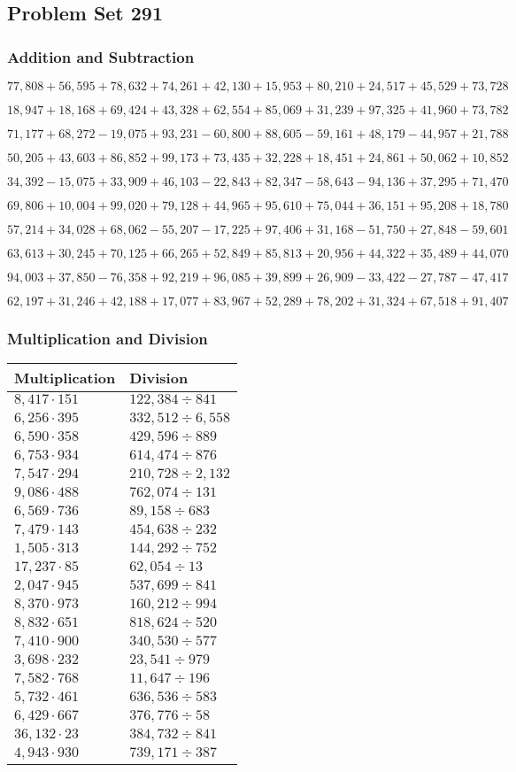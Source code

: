\hypertarget{problem-set-291}{%
\subsection{Problem Set 291}\label{problem-set-291}}

\hypertarget{addition-and-subtraction}{%
\subsubsection{Addition and
Subtraction}\label{addition-and-subtraction}}

\(77,808+56,595+78,632+74,261+42,130+15,953+80,210+24,517+45,529+73,728\)

\(18,947+18,168+69,424+43,328+62,554+85,069+31,239+97,325+41,960+73,782\)

\(71,177+68,272-19,075+93,231-60,800+88,605-59,161+48,179-44,957+21,788\)

\(50,205+43,603+86,852+99,173+73,435+32,228+18,451+24,861+50,062+10,852\)

\(34,392-15,075+33,909+46,103-22,843+82,347-58,643-94,136+37,295+71,470\)

\(69,806+10,004+99,020+79,128+44,965+95,610+75,044+36,151+95,208+18,780\)

\(57,214+34,028+68,062-55,207-17,225+97,406+31,168-51,750+27,848-59,601\)

\(63,613+30,245+70,125+66,265+52,849+85,813+20,956+44,322+35,489+44,070\)

\(94,003+37,850-76,358+92,219+96,085+39,899+26,909-33,422-27,787-47,417\)

\(62,197+31,246+42,188+17,077+83,967+52,289+78,202+31,324+67,518+91,407\)

\hypertarget{multiplication-and-division}{%
\subsubsection{Multiplication and
Division}\label{multiplication-and-division}}

\begin{longtable}[]{@{}ll@{}}
\toprule
Multiplication & Division\tabularnewline
\midrule
\endhead
\(8,417\cdot151\) & \(122,384÷841\)\tabularnewline
\(6,256\cdot395\) & \(332,512÷6,558\)\tabularnewline
\(6,590\cdot358\) & \(429,596÷889\)\tabularnewline
\(6,753\cdot934\) & \(614,474÷876\)\tabularnewline
\(7,547\cdot294\) & \(210,728÷2,132\)\tabularnewline
\(9,086\cdot488\) & \(762,074÷131\)\tabularnewline
\(6,569\cdot736\) & \(89,158÷683\)\tabularnewline
\(7,479\cdot143\) & \(454,638÷232\)\tabularnewline
\(1,505\cdot313\) & \(144,292÷752\)\tabularnewline
\(17,237\cdot85\) & \(62,054÷13\)\tabularnewline
\(2,047\cdot945\) & \(537,699÷841\)\tabularnewline
\(8,370\cdot973\) & \(160,212÷994\)\tabularnewline
\(8,832\cdot651\) & \(818,624÷520\)\tabularnewline
\(7,410\cdot900\) & \(340,530÷577\)\tabularnewline
\(3,698\cdot232\) & \(23,541÷979\)\tabularnewline
\(7,582\cdot768\) & \(11,647÷196\)\tabularnewline
\(5,732\cdot461\) & \(636,536÷583\)\tabularnewline
\(6,429\cdot667\) & \(376,776÷58\)\tabularnewline
\(36,132\cdot23\) & \(384,732÷841\)\tabularnewline
\(4,943\cdot930\) & \(739,171÷387\)\tabularnewline
\bottomrule
\end{longtable}
